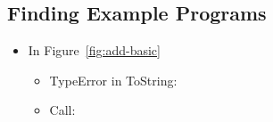 \subsection{Finding Example Programs}\label{sec:find-prog}

\begin{itemize}
  \item In Figure~\ref{fig:add-basic}
    \begin{itemize}
      \item TypeError in ToString:
      \item Call:
    \end{itemize}
\end{itemize}
